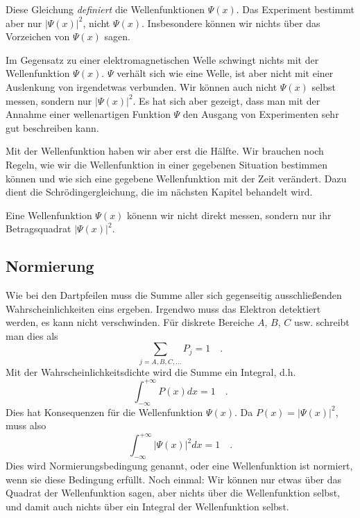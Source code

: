 Diese Gleichung \emph{definiert} die Wellenfunktionen $\Psi(x)$. Das Experiment bestimmt aber nur $|\Psi(x)|^2$, nicht $\Psi(x)$. Insbesondere können wir nichts über das Vorzeichen von $\Psi(x)$ sagen.

Im Gegensatz zu einer elektromagnetischen Welle schwingt nichts mit der Wellenfunktion $\Psi(x)$.  $\Psi$ verhält sich wie eine Welle, ist aber nicht mit einer Auslenkung von irgendetwas verbunden. Wir können auch nicht $\Psi(x)$ selbst messen, sondern nur $|\Psi(x)|^2$. Es hat sich aber gezeigt, dass man mit der Annahme einer wellenartigen Funktion $\Psi$ den Ausgang von Experimenten sehr gut beschreiben kann. 

Mit der Wellenfunktion haben wir aber erst die Hälfte. Wir brauchen noch Regeln, wie wir die Wellenfunktion in einer gegebenen Situation bestimmen können und wie sich eine gegebene Wellenfunktion mit der Zeit verändert. Dazu dient die Schrödingergleichung, die im nächsten Kapitel behandelt wird.

\begin{marginfigure}
    \caption{Eine Wellenfunktion $\Psi(x)$ könenn wir nicht direkt messen, sondern nur ihr Betragsquadrat $|\Psi(x)|^2$.}
\end{marginfigure}



\subsection{Normierung}

Wie bei den Dartpfeilen muss die Summe aller sich gegenseitig ausschließenden Wahrscheinlichkeiten eins ergeben. Irgendwo muss das Elektron detektiert werden, es kann nicht verschwinden. Für diskrete Bereiche $A$, $B$, $C$ usw. schreibt man dies als
\begin{equation}
    \sum_{j = A, B, C, \dots} P_j = 1 \quad .
\end{equation}
Mit der Wahrscheinlichkeitsdichte wird die Summe ein Integral, d.h.
\begin{equation}
    \int_{-\infty}^{+\infty} P(x) dx = 1 \quad .
\end{equation}
Dies hat Konsequenzen für die Wellenfunktion $\Psi(x)$. Da $P(x) = |\Psi(x)|^2$, muss also 
\begin{equation}
    \int_{-\infty}^{+\infty} |\Psi(x)|^2 dx = 1 \quad .
\end{equation}
Dies wird Normierungsbedingung genannt, oder eine Wellenfunktion ist normiert, wenn sie diese Bedingung erfüllt. Noch einmal: Wir können nur etwas über das Quadrat der Wellenfunktion sagen, aber nichts über die Wellenfunktion selbst, und damit auch nichts über ein Integral der Wellenfunktion selbst.

